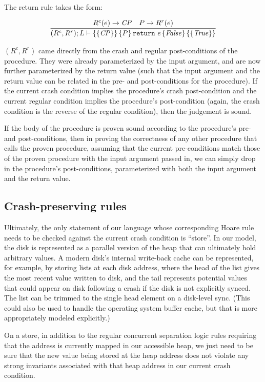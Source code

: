 The return rule takes the form:

\begin{gather*}
    \infer{\hoarestmt{(R^c,R^r)}{L}{\mathit{CP}}{P}{\texttt{return}~e}{\mathit{False}}{\mathit{True}}}
	  {R^c(e) \imp \mathit{CP} & P \imp R^r(e)}
\end{gather*}

$(R^c,R^r)$ came directly from the crash and regular post-conditions of the
procedure.
They were already parameterized by the input argument, and are now
further parameterized by the return value (such that the input argument and the
return value can be related in the pre- and post-conditions for the procedure).
If the current crash condition implies the procedure's crash post-condition and
the current regular condition implies the procedure's post-condition (again, the
crash condition is the reverse of the regular condition), then the judgement is
sound.

If the body of the procedure is proven sound according to the procedure's pre-
and post-conditions, then in proving the correctness of any other procedure that calls
the proven procedure, assuming that the current pre-conditions
match those of the proven procedure with the input argument passed in,
we can simply drop in the procedure's post-conditions, parameterized with both
the input argument and the return value.

\subsection{Crash-preserving rules}


Ultimately, the only statement of our language whose corresponding Hoare rule
needs to be checked against the current crash condition is ``store''.
In our
model, the disk is represented as a parallel version of the heap that can
ultimately hold arbitrary values.
A modern disk's internal write-back cache can be represented, for
example, by storing lists at each disk address, where the head of the list gives
the most recent value written to disk, and the tail represents potential values
that could appear on disk following a crash if the disk is not explicitly synced.
The list can be trimmed to the single head element on a disk-level sync.
(This could also be used to handle the operating system buffer cache,
but that is more appropriately modeled explicitly.)

On a store, in addition to the regular concurrent separation logic rules
requiring that the address is currently mapped in our accessible heap, we just need to
be sure that the new value being stored at the heap address does not violate any
strong invariants associated with that heap
address in our current crash condition.

